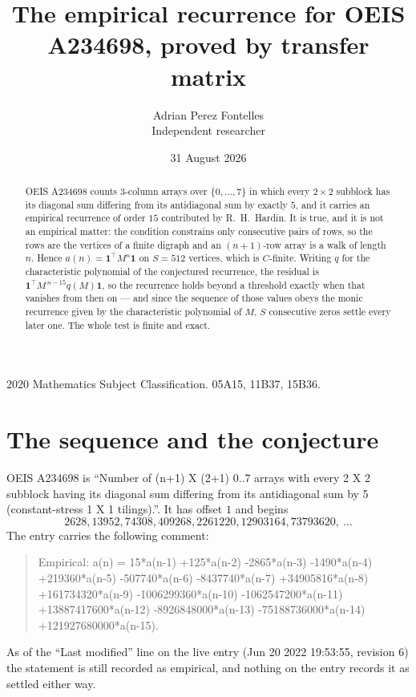 \documentclass[11pt,a4paper]{article}
\title{The empirical recurrence for OEIS A234698, proved by transfer matrix}
\author{Adrian Perez Fontelles\\ \small Independent researcher}
\date{31 August 2026}
\theoremstyle{plain}
\theoremstyle{definition}
\begin{document}
\maketitle

\begin{abstract}
OEIS A234698 counts $3$-column arrays over $\{0,\dots,7\}$ in which every
$2\times2$ subblock has its diagonal sum differing from its antidiagonal sum by
exactly $5$, and it
carries an empirical recurrence of order $15$ contributed by R.~H.~Hardin. It is true,
and it is not an empirical matter: the condition constrains only consecutive pairs of rows,
so the rows are the vertices of a finite digraph and an $(n+1)$-row array is a walk of
length $n$. Hence $a(n)=\mathbf{1}^{\!\top}M^{n}\mathbf{1}$ on $S=512$ vertices, which
is $C$-finite. Writing $q$ for the characteristic polynomial of the conjectured recurrence,
the residual is $\mathbf{1}^{\!\top}M^{\,n-15}q(M)\mathbf{1}$, so the recurrence
holds beyond a threshold exactly when that vanishes from then on --- and since the sequence
of those values obeys the monic recurrence given by the characteristic polynomial of $M$,
$S$ consecutive zeros settle every later one. The whole test is finite and exact.
\end{abstract}

\noindent\small 2020 Mathematics Subject Classification. 05A15, 11B37, 15B36.\normalsize

\section{The sequence and the conjecture}

OEIS A234698 is ``Number of (n+1) X (2+1) 0..7 arrays with every 2 X 2 subblock having its diagonal sum differing from its antidiagonal sum by 5 (constant-stress 1 X 1 tilings).''. It has offset
$1$ and begins
\[
2628, 13952, 74308, 409268, 2261220, 12903164, 73793620,\ \dots
\]
The entry carries the following comment:
\begin{quote}\small
Empirical: a(n) = 15*a(n-1) +125*a(n-2) -2865*a(n-3) -1490*a(n-4) +219360*a(n-5) -507740*a(n-6) -8437740*a(n-7) +34905816*a(n-8) +161734320*a(n-9) -1006299360*a(n-10) -1062547200*a(n-11) +13887417600*a(n-12) -8926848000*a(n-13) -75188736000*a(n-14) +121927680000*a(n-15).
\end{quote}
As of the ``Last modified'' line on the live entry (Jun 20 2022 19:53:55, revision 6) the statement is
still recorded as empirical, and nothing on the entry records it as settled either way.
\end{document}
